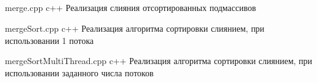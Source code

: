 \begin{appendices}
	\chapter{}
	{merge.cpp} %
	{c++} %
	{Реализация слияния отсортированных подмассивов} %
	
	{mergeSort.cpp} %
	{c++} %
	{Реализация алгоритма сортировки слиянием, при использовании 1 потока} %
	
	{mergeSortMultiThread.cpp} %
	{c++} %
	{Реализация алгоритма сортировки слиянием, при использовании заданного числа потоков} %
	
	
	
	
 
\end{appendices}
